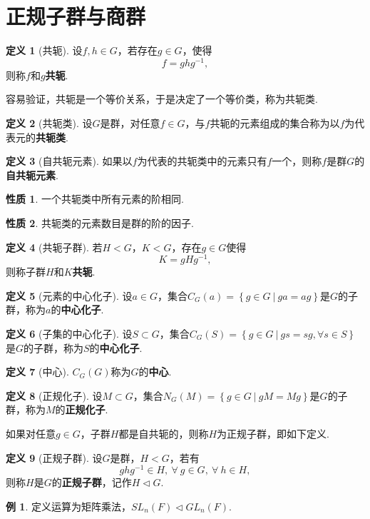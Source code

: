 \documentclass[12pt]{ctexart}
\theoremstyle{definition}
\newtheorem{definition}{定义}[section]
\newtheorem{property}{性质}[section]
\newtheorem{example}{例}[section]
\theoremstyle{plain}
\begin{document}
\section{正规子群与商群}
\begin{definition}[共轭]
	设$f,h\in G$，若存在$g\in G$，使得
	$$f=ghg^{-1},$$
	则称$f$和$g$\textbf{共轭}.
\end{definition}
容易验证，共轭是一个等价关系，于是决定了一个等价类，称为共轭类.
\begin{definition}[共轭类]
	设$G$是群，对任意$f\in G$，与$f$共轭的元素组成的集合称为以$f$为代表元的\textbf{共轭类}.
\end{definition}
\begin{definition}[自共轭元素]
	如果以$f$为代表的共轭类中的元素只有$f$一个，则称$f$是群$G$的\textbf{自共轭元素}.
\end{definition}
\begin{property}
	一个共轭类中所有元素的阶相同.
\end{property}
\begin{property}
	共轭类的元素数目是群的阶的因子.
\end{property}
\begin{definition}[共轭子群]
	若$H<G$，$K<G$，存在$g\in G$使得
	$$K=gHg^{-1},$$
	则称子群$H$和$K$\textbf{共轭}.
\end{definition}
\begin{definition}[元素的中心化子]
	设$a\in G$，集合$C_G(a)=\left\{g\in G\ |\ ga=ag\right\}$是$G$的子群，称为$a$的\textbf{中心化子}.
\end{definition}
\begin{definition}[子集的中心化子]
	设$S\subset G$，集合$C_G(S)=\left\{
	g\in G\ |\ gs=sg,\forall s\in S\right\}$是$G$的子群，称为$S$的\textbf{中心化子}.
\end{definition}
\begin{definition}[中心]
	$C_G(G)$称为$G$的\textbf{中心}.
\end{definition}
\begin{definition}[正规化子]
	设$M\subset G$，集合$N_G(M)=\left\{g\in G\ |\ gM=Mg\right\}$是$G$的子群，称为$M$的\textbf{正规化子}.
\end{definition}
如果对任意$g\in G$，子群$H$都是自共轭的，则称$H$为正规子群，即如下定义.
\begin{definition}[正规子群]
	设$G$是群，$H<G$，若有
	$$ghg^{-1}\in H,\ \forall\ g\in G,\ \forall\ h\in H,$$
	则称$H$是$G$的\textbf{正规子群}，记作$H\vartriangleleft G$.
\end{definition}
\begin{example}
	定义运算为矩阵乘法，$SL_n(F)\vartriangleleft GL_n(F)$.
\end{example}
\end{document}
